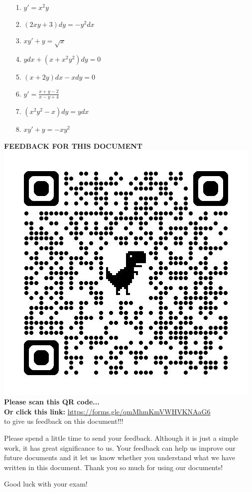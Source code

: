 \documentclass[12pt]{article}
\begin{document}
 \begin{multicols}{2}
\begin{enumerate}
    \item[1.] \( y' =x^2y \)
    \item[2.] \( (2xy +3)dy = -y^2dx \)
    \item[3.] \( xy' + y = \sqrt{x} \)
    \item[4.]\(ydx+(x+x^2y^2)dy=0\)
    \item[5.]\((x+2y)dx-xdy=0\) 
    \item[6.]\(y' =\displaystyle \frac{x+y-2}{x-y+4}\) 
    \item[7.]\((x^2y^2-x)dy=ydx\)
    \item[8.]\(xy'+y=-xy^2\) 
\end{enumerate}
\end{multicols}

  
  \newpage
\begin{center}
    \textbf{FEEDBACK FOR THIS DOCUMENT}\\
    \includegraphics[width=0.5\linewidth]{qr.jpg}\\
    \textbf{Please scan this QR code...}\\
    \textbf{Or click this link:} \url{https://forms.gle/qmMhmKmVWHVKNAaG6} \\
    to give us feedback on this document!!!
\end{center}
Please spend a little time to send your feedback. Although it is just a simple work, it has great significance to us. Your feedback can help us improve our future documents and it let us know whether you understand what we have written in this document. Thank you so much for using our documents!\\
\begin{center}
    Good luck with your exam!
\end{center}
\end{document}
